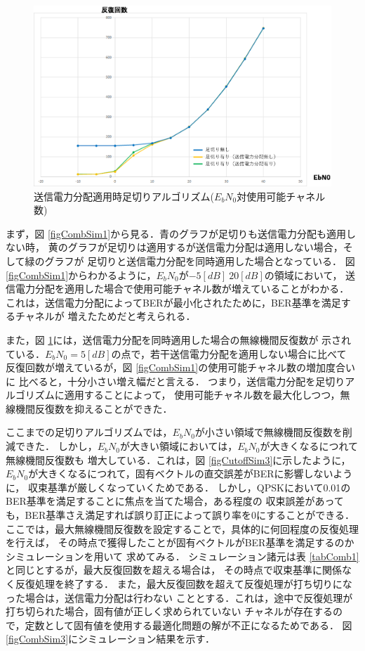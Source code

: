 \begin{figure}[h]
    \centering
    \includegraphics[width=0.95\linewidth]{chapter4/figure/CombSim2.eps}
    \caption{送信電力分配適用時足切りアルゴリズム($E_bN_0$対使用可能チャネル数)}
    \label{figCombSim2}
\end{figure}

まず，図 \ref{figCombSim1}から見る．青のグラフが足切りも送信電力分配も適用しない時，
黄のグラフが足切りは適用するが送信電力分配は適用しない場合，そして緑のグラフが
足切りと送信電力分配を同時適用した場合となっている．
図 \ref{figCombSim1}からわかるように，$E_bN_0$が$-5[dB]~20[dB]$の領域において，
送信電力分配を適用した場合で使用可能チャネル数が増えていることがわかる．
これは，送信電力分配によってBERが最小化されたために，BER基準を満足するチャネルが
増えたためだと考えられる．

また，図 \ref{figCombSim2}には，送信電力分配を同時適用した場合の無線機間反復数が
示されている．$E_bN_0=5[dB]$の点で，若干送信電力分配を適用しない場合に比べて
反復回数が増えているが，図 \ref{figCombSim1}の使用可能チャネル数の増加度合いに
比べると，十分小さい増え幅だと言える．
つまり，送信電力分配を足切りアルゴリズムに適用することによって，
使用可能チャネル数を最大化しつつ，無線機間反復数を抑えることができた．

ここまでの足切りアルゴリズムでは，$E_bN_0$が小さい領域で無線機間反復数を削減できた．
しかし，$E_bN_0$が大きい領域においては，$E_bN_0$が大きくなるにつれて無線機間反復数も
増大している．これは，図 \ref{figCutoffSim3}に示したように，
$E_bN_0$が大きくなるにつれて，固有ベクトルの直交誤差がBERに影響しないように，
収束基準が厳しくなっていくためである．
しかし，QPSKにおいて0.01のBER基準を満足することに焦点を当てた場合，ある程度の
収束誤差があっても，BER基準さえ満足すれば誤り訂正によって誤り率を0にすることができる．
ここでは，最大無線機間反復数を設定することで，具体的に何回程度の反復処理を行えば，
その時点で獲得したことが固有ベクトルがBER基準を満足するのかシミュレーションを用いて
求めてみる．
シミュレーション諸元は表 \ref{tabComb1}と同じとするが，最大反復回数を超える場合は，
その時点で収束基準に関係なく反復処理を終了する．
また，最大反復回数を超えて反復処理が打ち切りになった場合は，送信電力分配は行わない
こととする．これは，途中で反復処理が打ち切られた場合，固有値が正しく求められていない
チャネルが存在するので，定数として固有値を使用する最適化問題の解が不正になるためである．
図 \ref{figCombSim3}にシミュレーション結果を示す．

